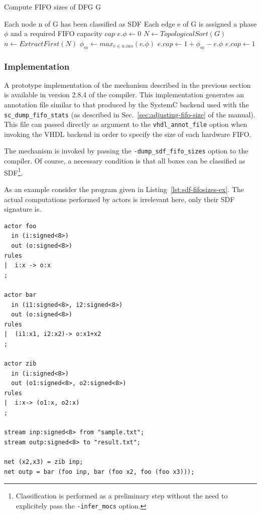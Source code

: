 \begin{algorithm} \caption{Compute FIFO sizes of DFG G}
\label{alg:phase-prop}
\begin{algorithmic}[1]
\Require Each node n of G has been classified as SDF
\Ensure Each edge e of G is assigned a phase $\phi$ and a required FIFO capacity $cap$
\State $e.\phi \gets 0$
\EndFor
\EndFor
\State $N \gets TopologicalSort(G)$
\State $n \gets ExtractFirst(N)$
\State $\phi_m \gets max_{e \in n.ins}(e.\phi)$
\State $e.cap \gets 1 + \phi_m - e.\phi$
\Else
\State $e.cap \gets 1$
\EndIf
\EndFor
{}
\EndFor
\EndWhile
\end{algorithmic}
\end{algorithm}

\subsubsection{Implementation}
\label{sec:moc-class-impl}

A prototype implementation of the mechanism described in the previous section is available in
version 2.8.4 of the compiler.
This implementation generates an annotation file similar to that produced by the SystemC backend
used with the \verb|sc_dump_fifo_stats| (as described in Sec.~\ref{sec:adjusting-fifo-size} of the manual). 
This file can passed directly as argument to the \verb|vhdl_annot_file| option when invoking the
VHDL backend in order to specify the size of each hardware FIFO.

\medskip
The mechanism is invoked by passing the \verb|-dump_sdf_fifo_sizes| option to the compiler. Of
course, a necessary condition is that all boxes can be classified as SDF\footnote{Classification is
  performed as a preliminary step without the need to explicitely pass the
  \texttt{-infer\_mocs} option.}. 

\medskip 
As an example consider the program given in Listing~\ref{lst:sdf-fifosizes-ex}. The actual
computations performed by actors is irrelevant here, only their SDF signature is. 

\begin{lstlisting}[label=lst:sdf-fifosizes-ex,basicstyle=\small]
actor foo
  in (i:signed<8>)
  out (o:signed<8>)
rules
|  i:x -> o:x
;

actor bar
  in (i1:signed<8>, i2:signed<8>)
  out (o:signed<8>)
rules
|  (i1:x1, i2:x2)-> o:x1+x2
;

actor zib
  in (i:signed<8>)
  out (o1:signed<8>, o2:signed<8>)
rules
|  i:x-> (o1:x, o2:x)
;

stream inp:signed<8> from "sample.txt";
stream outp:signed<8> to "result.txt";

net (x2,x3) = zib inp;
net outp = bar (foo inp, bar (foo x2, foo (foo x3)));
\end{lstlisting}



